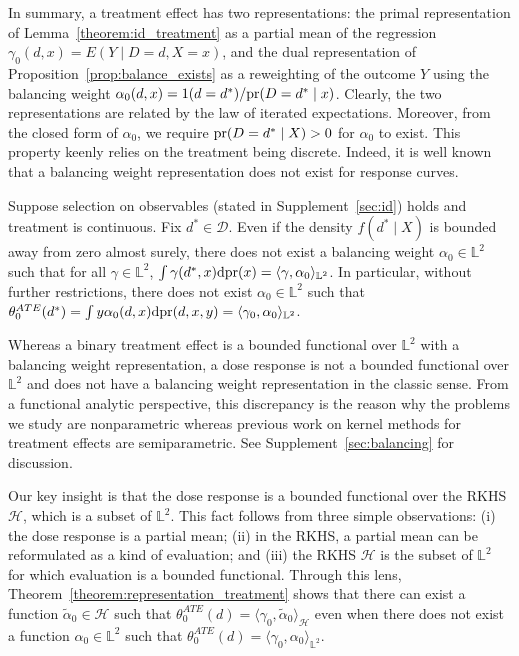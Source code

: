 In summary, a treatment effect has two representations: the primal representation of Lemma~\ref{theorem:id_treatment} as a partial mean of the regression $\gamma_0(d,x)=E(Y \mid D=d,X=x)$, and the dual representation of Proposition~\ref{prop:balance_exists} as a reweighting of the outcome $Y$ using the balancing weight $\alpha_0(d,x)=1(d=d^*)/\text{\normalfont pr}(D=d^* \mid x)$. Clearly, the two representations are related by the law of iterated expectations. Moreover, from the closed form of $\alpha_0$, we require $\text{\normalfont pr}(D=d^* \mid X)>0$ for $\alpha_0$ to exist. This property keenly relies on the treatment being discrete. Indeed, it is well known that a balancing weight representation does not exist for response curves.

\begin{proposition}\label{prop:balance_dne}
Suppose selection on observables (stated in Supplement~\ref{sec:id}) holds and treatment is continuous. Fix $d^*\in\mathcal{D}$. Even if the density $f(d^* \mid X)$ is bounded away from zero almost surely, there does not exist a balancing weight $\alpha_0\in \mathbb{L}^2$ such that for all $\gamma\in \mathbb{L}^2$, $\int \gamma(d^*,x)\mathrm{d}\text{\normalfont pr}(x)=\langle \gamma,\alpha_0 \rangle_{\mathbb{L}^2}$. In particular, without further restrictions, there does not exist $\alpha_0\in \mathbb{L}^2$ such that  $\theta_0^{ATE}(d^*)=\int y\alpha_0(d,x)\mathrm{d}\text{\normalfont pr}(d,x,y)=\langle \gamma_0,\alpha_0 \rangle_{\mathbb{L}^2}$.
\end{proposition}

 Whereas a binary treatment effect is a bounded functional over $\mathbb{L}^2$ with a balancing weight representation, a dose response is not a bounded functional over $\mathbb{L}^2$ and does not have a balancing weight representation in the classic sense. From a functional analytic perspective, this discrepancy is the reason why the problems we study are nonparametric whereas previous work on kernel methods for treatment effects are semiparametric. See Supplement~\ref{sec:balancing} for discussion. 



Our key insight is that the dose response is a bounded functional over the RKHS $\mathcal{H}$, which is a subset of $\mathbb{L}^2$. This fact follows from three simple observations: (i) the dose response is a partial mean; (ii) in the RKHS, a partial mean can be reformulated as a kind of evaluation; and (iii) the RKHS $\mathcal{H}$ is the subset of $\mathbb{L}^2$ for which evaluation is a bounded functional. Through this lens, Theorem~\ref{theorem:representation_treatment} shows that there can exist a function $\tilde{\alpha}_0\in\mathcal{H}$ such that $\theta_0^{ATE}(d)=\langle \gamma_0,\tilde{\alpha}_0 \rangle_{\mathcal{H}}$ even when there does not exist a function $\alpha_0\in \mathbb{L}^2$ such that $\theta_0^{ATE}(d)=\langle \gamma_0,\alpha_0 \rangle_{\mathbb{L}^2}$.

